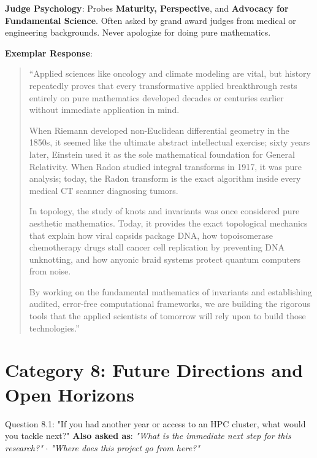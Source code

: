 \documentclass[11pt,letterpaper]{article}
\begin{document}
\begin{strategybox}
\textbf{Judge Psychology}: Probes \textbf{Maturity, Perspective}, and \textbf{Advocacy for Fundamental Science}. Often asked by grand award judges from medical or engineering backgrounds. Never apologize for doing pure mathematics.
\end{strategybox}

\begin{exemplarbox}
\textbf{Exemplar Response}:
\begin{quote}
``Applied sciences like oncology and climate modeling are vital, but history repeatedly proves that every transformative applied breakthrough rests entirely on pure mathematics developed decades or centuries earlier without immediate application in mind.

When Riemann developed non-Euclidean differential geometry in the 1850s, it seemed like the ultimate abstract intellectual exercise; sixty years later, Einstein used it as the sole mathematical foundation for General Relativity. When Radon studied integral transforms in 1917, it was pure analysis; today, the Radon transform is the exact algorithm inside every medical CT scanner diagnosing tumors.

In topology, the study of knots and invariants was once considered pure aesthetic mathematics. Today, it provides the exact topological mechanics that explain how viral capsids package DNA, how topoisomerase chemotherapy drugs stall cancer cell replication by preventing DNA unknotting, and how anyonic braid systems protect quantum computers from noise. 

By working on the fundamental mathematics of invariants and establishing audited, error-free computational frameworks, we are building the rigorous tools that the applied scientists of tomorrow will rely upon to build those technologies.''
\end{quote}
\end{exemplarbox}

\newpage
\section{Category 8: Future Directions and Open Horizons}

\begin{questionbox}{Question 8.1: "If you had another year or access to an HPC cluster, what would you tackle next?"}
\textbf{Also asked as}: \textit{"What is the immediate next step for this research?"} $\cdot$ \textit{"Where does this project go from here?"}
\end{questionbox}
\end{document}
